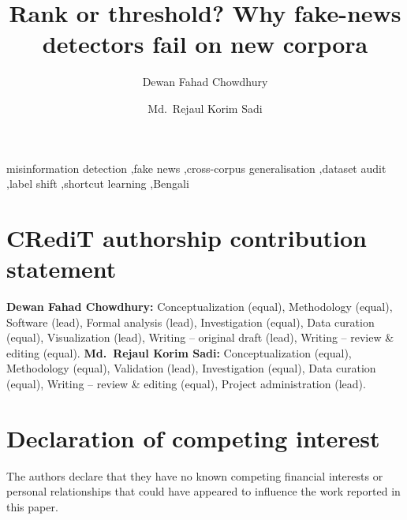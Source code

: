 \documentclass[review,3p,authoryear]{elsarticle}
\theoremstyle{definition}
\theoremstyle{plain}
\begin{document}
\begin{frontmatter}

\title{Rank or threshold? Why fake-news detectors fail on new corpora}

\author[mu]{Dewan Fahad Chowdhury}
\author[mu]{Md.\ Rejaul Korim Sadi}



\begin{highlights}

\end{highlights}

\begin{keyword}
misinformation detection \sep fake news \sep cross-corpus generalisation \sep dataset audit \sep label shift \sep shortcut learning \sep Bengali
\end{keyword}
\end{frontmatter}

\linenumbers








\section*{CRediT authorship contribution statement}
\textbf{Dewan Fahad Chowdhury:} Conceptualization (equal), Methodology (equal), Software (lead), Formal analysis (lead), Investigation (equal), Data curation (equal), Visualization (lead), Writing -- original draft (lead), Writing -- review \& editing (equal). \textbf{Md.\ Rejaul Korim Sadi:} Conceptualization (equal), Methodology (equal), Validation (lead), Investigation (equal), Data curation (equal), Writing -- review \& editing (equal), Project administration (lead).

\section*{Declaration of competing interest}
The authors declare that they have no known competing financial interests or personal relationships that could have appeared to influence the work reported in this paper.
\end{document}
